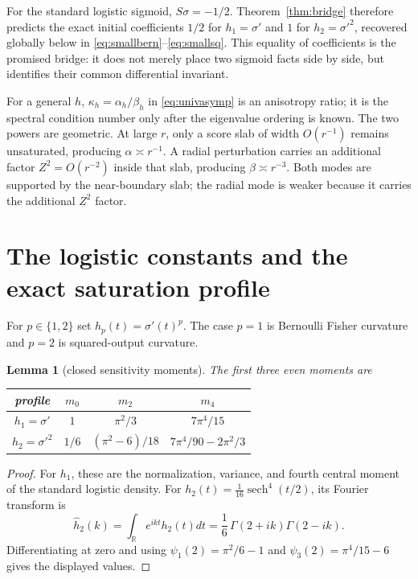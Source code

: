 \documentclass[11pt]{article}
\newtheorem{lemma}[theorem]{Lemma}
\newcommand{\R}{\mathbb R}
\newcommand{\sech}{\operatorname{sech}}
\begin{document}
For the standard logistic sigmoid, $S\sigma=-1/2$.  Theorem~\ref{thm:bridge} therefore predicts the exact initial
coefficients $1/2$ for $h_1=\sigma'$ and $1$ for $h_2=\sigma'^2$, recovered globally below in
\eqref{eq:smallbern}--\eqref{eq:smallsq}.  This equality of coefficients is the promised bridge: it does not merely
place two sigmoid facts side by side, but identifies their common differential invariant.

For a general $h$, $\kappa_h=\alpha_h/\beta_h$ in \eqref{eq:univasymp} is an anisotropy ratio; it is the spectral
condition number only after the eigenvalue ordering is known.  The two powers are geometric.  At large $r$, only a
score slab of width $O(r^{-1})$ remains unsaturated, producing
$\alpha\asymp r^{-1}$.  A radial perturbation carries an additional factor $Z^2=O(r^{-2})$ inside that slab,
producing $\beta\asymp r^{-3}$.  Both modes are supported by the near-boundary slab; the radial mode is weaker
because it carries the additional $Z^2$ factor.

\section{The logistic constants and the exact saturation profile}

For $p\in\{1,2\}$ set $h_p(t)=\sigma'(t)^p$.  The case $p=1$ is Bernoulli Fisher curvature and $p=2$ is
squared-output curvature.

\begin{lemma}[closed sensitivity moments]
\label{lem:moments}
The first three even moments are
\begin{center}
\begin{tabular}{c@{\qquad}ccc}
\toprule
profile & $m_0$ & $m_2$ & $m_4$\\
\midrule
$h_1=\sigma'$ & $1$ & $\pi^2/3$ & $7\pi^4/15$\\[2pt]
$h_2=\sigma'^2$ & $1/6$ & $(\pi^2-6)/18$ & $7\pi^4/90-2\pi^2/3$\\
\bottomrule
\end{tabular}
\end{center}
\end{lemma}

\begin{proof}
For $h_1$, these are the normalization, variance, and fourth central moment of the standard logistic density.
For $h_2(t)=\frac1{16}\sech^4(t/2)$, its Fourier transform is
\begin{equation}
 \widehat h_2(k)=\int_\R e^{ikt}h_2(t)dt
 =\frac16\,\Gamma(2+ik)\Gamma(2-ik).
 \label{eq:fourier}
\end{equation}
Differentiating at zero and using
$\psi_1(2)=\pi^2/6-1$ and $\psi_3(2)=\pi^4/15-6$ gives the displayed values.
\end{proof}
\end{document}
